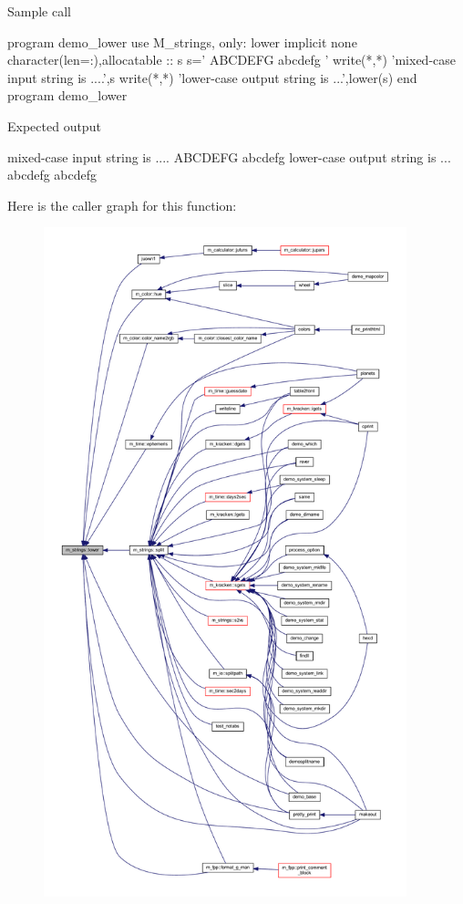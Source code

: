 \begin{DoxyVerb}Sample call

   program demo_lower
   use M_strings, only: lower
   implicit none
   character(len=:),allocatable  :: s
      s=' ABCDEFG abcdefg '
      write(*,*) 'mixed-case input string is ....',s
      write(*,*) 'lower-case output string is ...',lower(s)
   end program demo_lower

Expected output

   mixed-case input string is .... ABCDEFG abcdefg
   lower-case output string is ... abcdefg abcdefg \end{DoxyVerb}
 Here is the caller graph for this function\+:
\nopagebreak
\begin{figure}[H]
\begin{center}
\leavevmode
\includegraphics[height=550pt]{namespacem__strings_a3c7d4be9051206e4b2f72112f9fdc3b4_icgraph}
\end{center}
\end{figure}
\mbox{\label{namespacem__strings_a1f9a363d0432f7373ef6a388f5893b0e}} 
